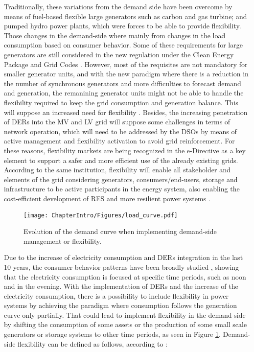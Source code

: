 Traditionally, these variations from the demand side have been overcome by means of fuel-based flexible large generators such as carbon and gas turbine; and pumped hydro power plants, which were forces to be able to provide flexibility. Those changes in the demand-side where mainly from changes in the load consumption based on consumer behavior.
Some of these requirements for large generators are still considered in the new regulation under the Clean Energy Package and Grid Codes \cite{validzic2017clean}. However, most of the requisites are not mandatory for smaller generator units, and with the new paradigm where there is a reduction in the number of synchronous generators and more difficulties to forecast demand and generation, the remanining generator units might not be able to handle the flexibility required to keep the grid consumption and generation balance. This will suppose an increased need for flexibility \cite{Xu2019}. Besides, the increasing penetration of DERs into the MV and LV grid will suppose some challenges in terms of network operation, which will need to be addressed by the DSOs by means of active management and flexibility activation to avoid grid reinforcement. For these reasons, flexibility markets are being recognized in the e-Directive \cite{Directive2019944} as a key element to support a safer and more efficient use of the already existing grids.
According to the same institution, flexibility will enable all stakeholder and elements of the grid considering generators, consumers/end-users, storage and infrastructure to be active participants in the energy system, also enabling the cost-efficient development of RES and more resilient power systems \cite{Hillberg2019}.  

\begin{figure}[h]
	\centering 
	\texttt{[image: ChapterIntro/Figures/load\_curve.pdf]}
		\caption{Evolution of the demand curve when implementing demand-side management or flexibility.}  
		\label{fig:load_shifting}
\end{figure}


Due to the increase of electricity consumption and DERs integration in the last 10 years, the consumer behavior patterns have been broadly studied \cite{ZHOU201773,TORRITI2014265}, showing that the electricity consumption is focused at specific time periods, such as noon and in the evening. With the implementation of DERs and the increase of the electricity consumption, there is a possibility to include flexibility in power systems by achieving the paradigm where consumption follows the generation curve only partially. That could lead to implement flexibility in the demand-side by shifting the consumption of some assets or the production of some small scale generators or storage systems to other time periods, as seen in Figure \ref{fig:load_shifting}. Demand-side flexibility can be defined as follows, according to \cite{EuropeanSmartGridsTaskForceExpertGroup32019}:  

